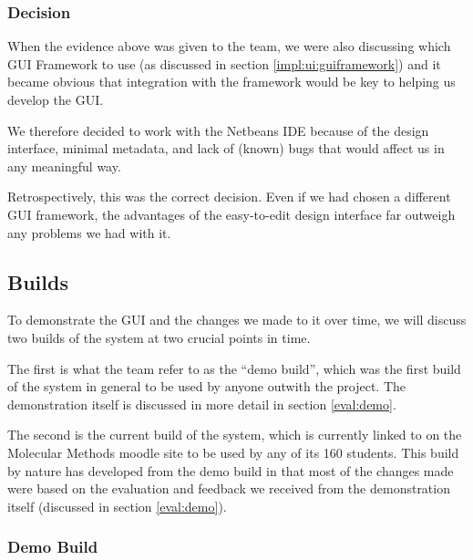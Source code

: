 \subsubsection{Decision}
\label{impl:ui:ide:decision}

When the evidence above was given to the team, we were also discussing
which GUI Framework to use (as discussed in section
\ref{impl:ui:guiframework}) and it became obvious that integration
with the framework would be key to helping us develop the GUI.

We therefore decided to work with the Netbeans IDE because of the
design interface, minimal metadata, and lack of (known) bugs that
would affect us in any meaningful way.

Retrospectively, this was the correct decision.
Even if we had chosen a different GUI framework, the advantages of the
easy-to-edit design interface far outweigh any problems we had with
it.

\subsection{Builds}
\label{impl:ui:builds}

To demonstrate the GUI and the changes we made to it over time, we
will discuss two builds of the system at two crucial points in time.

The first is what the team refer to as the ``demo build'', which was
the first build of the system in general to be used by anyone outwith
the project.
The demonstration itself is discussed in more detail in section
\ref{eval:demo}.

The second is the current build of the system, which is currently
linked to on the Molecular Methods moodle site to be used by any of
its 160 students.
This build by nature has developed from the demo build in that most of
the changes made were based on the evaluation and feedback we received
from the demonstration itself (discussed in section \ref{eval:demo}).

\subsubsection{Demo Build}

